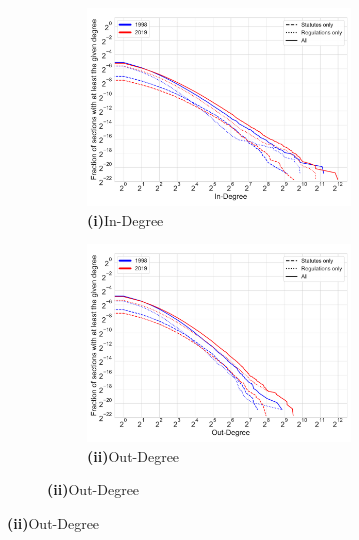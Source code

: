 \documentclass[varwidth, border=0pt]{standalone}
\begin{document}
	
	\begin{figure}
	\centering
\begin{subfigure}{\linewidth}
	\begin{multicols}{2}
		\centering
		\begin{subfigure}{\linewidth}
			\includegraphics[width=\linewidth]{../../graphics/in-degree-us-1998-2019.pdf}
			\caption*{\textbf{\textsf{(i)}}\quad In-Degree}
		\end{subfigure}
		\newpage
		\begin{subfigure}{\linewidth}
			\includegraphics[width=\linewidth]{../../graphics/out-degree-us-1998-2019.pdf}
			\caption*{\textbf{\textsf{(ii)}}\quad Out-Degree}
		\end{subfigure}	
	\end{multicols}
	\vspace*{-6pt}
\end{subfigure}


\end{figure}
\end{document}
